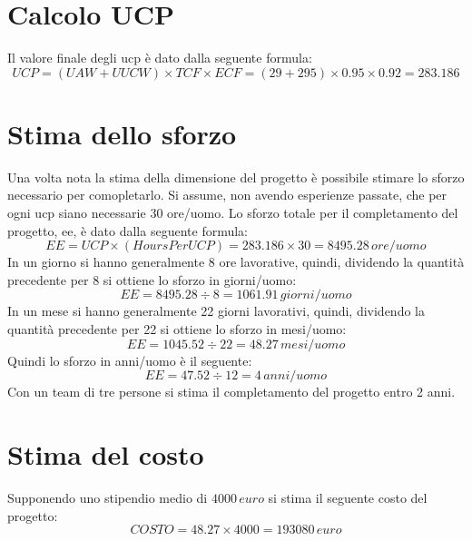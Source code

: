 \section{Calcolo UCP}
Il valore finale degli \acrfull{ucp} è dato dalla seguente formula:
\begin{displaymath}
	UCP = (UAW + UUCW) \times TCF \times ECF = (29 + 295) \times 0.95 \times 0.92 = 283.186
\end{displaymath}

\section{Stima dello sforzo}
Una volta nota la stima della dimensione del progetto è possibile stimare lo sforzo necessario per comopletarlo.
Si assume, non avendo esperienze passate, che per ogni \gls{ucp} siano necessarie 30 ore/uomo.
Lo sforzo totale per il completamento del progetto, \gls{ee}, è dato dalla seguente formula:
\begin{displaymath}
	EE = UCP \times (Hours Per UCP) = 283.186 \times 30 = 8495.28\, ore/uomo
\end{displaymath}
In un giorno si hanno generalmente 8 ore lavorative, quindi, dividendo la quantità precedente per 8 si ottiene lo sforzo in giorni/uomo:
\begin{displaymath}
	EE = 8495.28 \div 8 = 1061.91\, giorni/uomo
\end{displaymath}
In un mese si hanno generalmente 22 giorni lavorativi, quindi, dividendo la quantità precedente per 22 si ottiene lo sforzo in mesi/uomo:
\begin{displaymath}
	EE = 1045.52 \div 22 = 48.27\, mesi/uomo
\end{displaymath}
Quindi lo sforzo in anni/uomo è il seguente:
\begin{displaymath}
	EE = 47.52 \div 12 = 4\, anni/uomo
\end{displaymath}
Con un team di tre persone si stima il completamento del progetto entro 2 anni.

\section{Stima del costo}
Supponendo uno stipendio medio di \(4000\, euro\) si stima il seguente costo del progetto:
\begin{displaymath}
	COSTO = 48.27 \times 4000 = 193080\, euro
\end{displaymath}

